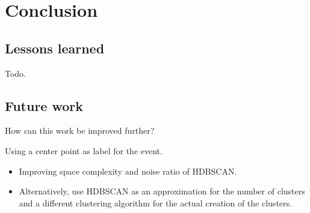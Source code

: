 \section{Conclusion}

\subsection{Lessons learned}
Todo.

\subsection{Future work}

How can this work be improved further?

Using a center point as label for the event.

\begin{itemize}
    \item Improving space complexity and noise ratio of HDBSCAN.
    \item Alternatively, use HDBSCAN as an approximation for the number of clusters and a different clustering algorithm
    for the actual creation of the clusters.
\end{itemize}
